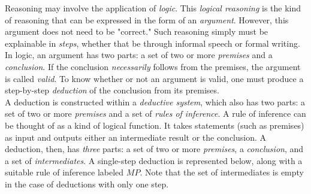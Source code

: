 Reasoning may involve the application of \textit{logic}. This \textit{logical reasoning} is the kind of reasoning that can be expressed in the form of an \textit{argument}. However, this argument does not need to be "correct." Such reasoning simply must be explainable in \textit{steps}, whether that be through informal speech or formal writing. \\

In logic, an argument has two parts: a set of two or more \textit{premises} and a \textit{conclusion}. If the conclusion \textit{necessarily} follows from the premises, the argument is called \textit{valid}. To know whether or not an argument is valid, one must produce a step-by-step \textit{deduction} of the conclusion from its premises. \\

A deduction is constructed within a \textit{deductive system}, which also has two parts: a set of two or more \textit{premises} and a set of \textit{rules of inference}. A rule of inference can be thought of as a kind of logical function. It takes statements (such as premises) as input and outputs either an intermediate result or the conclusion. A deduction, then, has \textit{three} parts: a set of two or more \textit{premises}, a \textit{conclusion}, and a set of \textit{intermediates}. A single-step deduction is represented below, along with a suitable rule of inference labeled $MP$. Note that the set of intermediates is empty in the case of deductions with only one step. \\[2mm]

